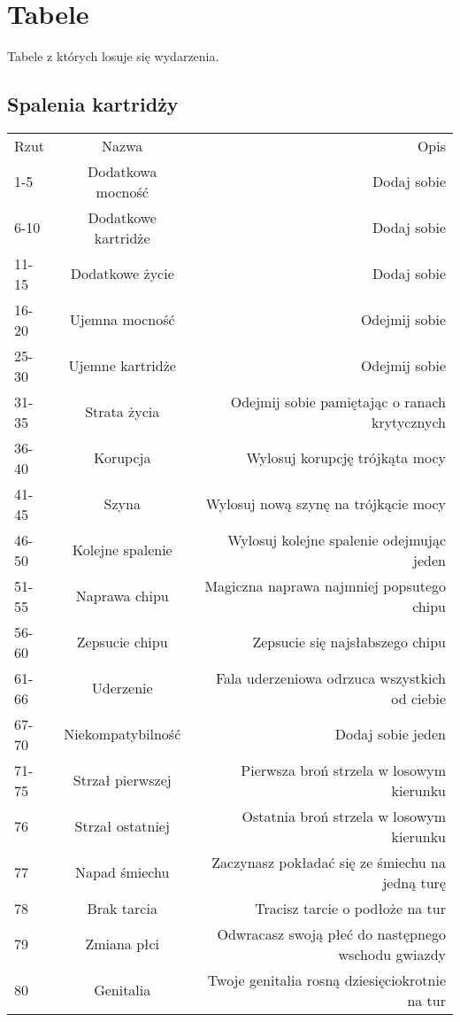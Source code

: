 \chapter{Tabele}
Tabele z których losuje się wydarzenia.

\section{Spalenia kartridży}
\begin{longtabu}{ l c r }
Rzut \dc	&	Nazwa		&	Opis	\\
1-5			&	Dodatkowa mocność		&	Dodaj sobie \dxx \xpmcn	\\
6-10		&	Dodatkowe kartridże		&	Dodaj sobie \diiii \abkar	\\
11-15		&	Dodatkowe życie			&	Dodaj sobie \diiii \abzyc	\\
16-20		&	Ujemna mocność			&	Odejmij sobie \diiii \xpmcn	\\
25-30		&	Ujemne kartridże		&	Odejmij sobie \diiii \abkar	\\
31-35		&	Strata życia			&	Odejmij sobie \diiii \abzyc pamiętając o ranach krytycznych	\\
36-40		&	Korupcja				&	Wylosuj korupcję trójkąta mocy 	\\
41-45		&	Szyna					&	Wylosuj nową szynę na trójkącie mocy \\
46-50		&	Kolejne spalenie		&	Wylosuj kolejne spalenie odejmując jeden \abkar \\
51-55		&	Naprawa chipu			&	Magiczna naprawa najmniej popsutego chipu \\
56-60		&	Zepsucie chipu			&	Zepsucie się najsłabszego chipu	\\
61-66		&	Uderzenie				&	Fala uderzeniowa odrzuca wszystkich od ciebie \\
67-70		&	Niekompatybilność		&	Dodaj sobie jeden \abnkp \\ 
71-75		&	Strzał pierwszej		&	Pierwsza broń strzela w losowym kierunku \\
76			&	Strzał ostatniej		&	Ostatnia broń strzela w losowym kierunku \\
77			&	Napad śmiechu			&	Zaczynasz pokładać się ze śmiechu na jedną turę \\
78			&	Brak tarcia				&	Tracisz tarcie o podłoże na \diiii tur \\
79			&	Zmiana płci				&	Odwracasz swoją płeć do następnego wschodu gwiazdy \\
80			&	Genitalia				&	Twoje genitalia rosną dziesięciokrotnie na \diiii tur \\

\end{longtabu}
